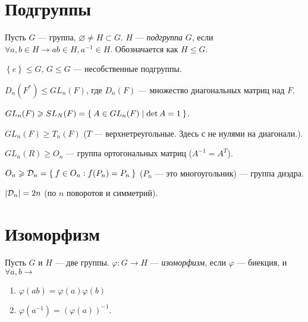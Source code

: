 \section{Подгруппы}

\begin{define*}
  Пусть $G$ --- группа, $\varnothing \neq H \subset G$. $H$ --- \emph{подгруппа} $G$, если $\forall a, b \in H \to ab \in H, a^{-1} \in H$. 
  Обозначается как $H \le G$.
\end{define*}

\begin{define*}
  $\left\{ e \right\} \le G$, $G \le G$ --- несобственные подгруппы.
\end{define*}

\begin{example}
  $D_n(F^*) \le GL_n(F)$, где $D_n(F)$ --- множество диагональных матриц над $F$.
\end{example}

\begin{example}
  $GL_n(F) \geqslant SL_N(F) = \Set{ A \in GL_n(F) | \det{A} = 1 }$.
\end{example}

\begin{exercise}
  $GL_n(F) \ge T_n(F)$ ($T$ --- верхнетреугольные. Здесь с не нулями на диагонали.).
\end{exercise}

\begin{example}
  $GL_n(R)	\ge O_n$ --- группа ортогональных матриц ($A^{-1} = A^T$).
\end{example}

\begin{example}
  $O_n \geqslant \mathcal{D}_n = \Set{ f \in O_n: f(P_n) = P_n }$ ($P_n$ --- это многоугольник) --- группа диэдра.
\end{example}

\begin{exercise}
  $\left\lvert \mathcal{D}_n \right\rvert = 2n$ (по $n$ поворотов и симметрий).
\end{exercise}

\section{Изоморфизм}

\begin{define*}
  Пусть $G$ и $H$ --- две группы. $\varphi: G\to H$ --- \emph{изоморфизм}, если $\varphi$ --- биекция, и $\forall a, b \to$
  \begin{enumerate}
	\item $\varphi(ab) = \varphi(a)\varphi(b)$
	\item $\varphi(a^{-1}) = (\varphi(a))^{-1}$.
  \end{enumerate}
\end{define*}

